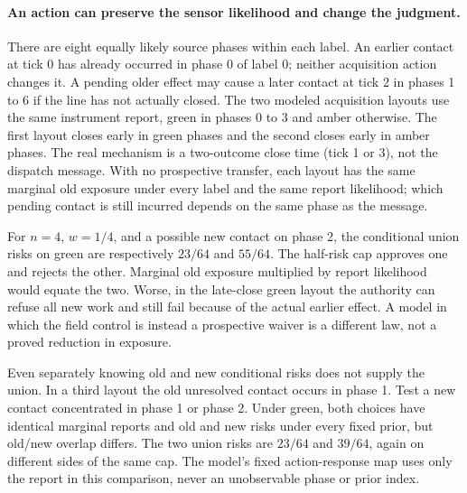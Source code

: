 \documentclass{article}
\begin{document}
\paragraph{An action can preserve the sensor likelihood and change the judgment.}
There are eight equally likely source phases within each label. An earlier contact at tick 0 has already occurred in phase 0 of label 0; neither acquisition action changes it. A pending older effect may cause a later contact at tick 2 in phases 1 to 6 if the line has not actually closed. The two modeled acquisition layouts use the same instrument report, green in phases 0 to 3 and amber otherwise. The first layout closes early in green phases and the second closes early in amber phases. The real mechanism is a two-outcome close time (tick 1 or 3), not the dispatch message. With no prospective transfer, each layout has the same marginal old exposure under every label and the same report likelihood; which pending contact is still incurred depends on the same phase as the message.

For $n=4$, $w=1/4$, and a possible new contact on phase 2, the conditional union risks on green are respectively $23/64$ and $55/64$. The half-risk cap approves one and rejects the other. Marginal old exposure multiplied by report likelihood would equate the two. Worse, in the late-close green layout the authority can refuse all new work and still fail because of the actual earlier effect. A model in which the field control is instead a prospective waiver is a different law, not a proved reduction in exposure.

Even separately knowing old and new conditional risks does not supply the union. In a third layout the old unresolved contact occurs in phase 1. Test a new contact concentrated in phase 1 or phase 2. Under green, both choices have identical marginal reports and old and new risks under every fixed prior, but old/new overlap differs. The two union risks are $23/64$ and $39/64$, again on different sides of the same cap. The model's fixed action-response map uses only the report in this comparison, never an unobservable phase or prior index.
\end{document}
